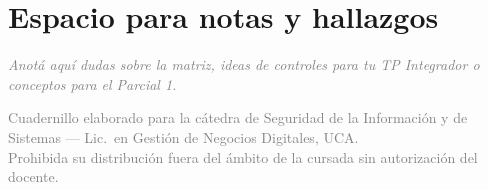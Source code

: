 \documentclass[12pt,a4paper]{article}
\begin{document}
\vspace{1cm}

\section{Espacio para notas y hallazgos}

\begin{tcolorbox}[colback=grisClaro, colframe=gray!50, arc=2mm, height=7cm]
\textcolor{gray}{\itshape Anot\'a aqu\'i dudas sobre la matriz, ideas de controles para tu TP Integrador o conceptos para el Parcial 1.}
\end{tcolorbox}

\vfill
\begin{center}
\small\textcolor{gray}{%
Cuadernillo elaborado para la c\'atedra de Seguridad de la Informaci\'on y de
Sistemas --- Lic.\ en Gesti\'on de Negocios Digitales, UCA.\\
Prohibida su distribuci\'on fuera del \'ambito de la cursada sin autorizaci\'on del docente.}
\end{center}
\end{document}
